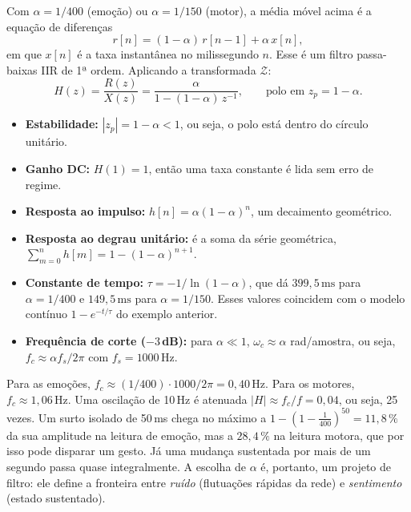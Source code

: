 \documentclass[11pt,a4paper]{article}
\newcommand{\ms}{\,\mathrm{ms}}
\newcommand{\Hz}{\,\mathrm{Hz}}
\begin{document}
Com $\alpha = 1/400$ (emoção) ou $\alpha=1/150$ (motor), a média móvel acima é a equação de diferenças
\begin{equation}
r[n] = (1-\alpha)\,r[n-1] + \alpha\,x[n],
\end{equation}
em que $x[n]$ é a taxa instantânea no milissegundo $n$. Esse é um filtro passa-baixas IIR de 1ª ordem. Aplicando a
transformada $\mathcal{Z}$:
\begin{equation}
H(z)=\frac{R(z)}{X(z)}=\frac{\alpha}{1-(1-\alpha)\,z^{-1}}, \qquad \text{polo em } z_p = 1-\alpha .
\end{equation}
\begin{itemize}
  \item \textbf{Estabilidade:} $|z_p| = 1-\alpha < 1$, ou seja, o polo está dentro do círculo unitário.
  \item \textbf{Ganho DC:} $H(1)=1$, então uma taxa constante é lida sem erro de regime.
  \item \textbf{Resposta ao impulso:} $h[n]=\alpha(1-\alpha)^n$, um decaimento geométrico.
  \item \textbf{Resposta ao degrau unitário:} é a soma da série geométrica,
        $\sum_{m=0}^{n}h[m] = 1-(1-\alpha)^{n+1}$.
  \item \textbf{Constante de tempo:} $\tau=-1/\ln(1-\alpha)$, que dá $399{,}5\ms$ para $\alpha = 1/400$ e $149{,}5\ms$ para
        $\alpha = 1/150$. Esses valores coincidem com o modelo contínuo $1-e^{-t/\tau}$ do exemplo anterior.
  \item \textbf{Frequência de corte ($-3$\,dB):} para $\alpha\ll1$, $\omega_c\approx\alpha$ rad/amostra, ou seja,
        $f_c\approx \alpha f_s/2\pi$ com $f_s = 1000\Hz$.
\end{itemize}

\begin{exemplo}
Para as emoções, $f_c \approx (1/400)\cdot1000/2\pi = 0{,}40\Hz$. Para os motores, $f_c \approx 1{,}06\Hz$. Uma oscilação de 10\,Hz é
atenuada $|H|\approx f_c/f = 0{,}04$, ou seja, 25 vezes. Um surto isolado de 50\,ms chega no máximo a
$1-(1-\tfrac{1}{400})^{50}=11{,}8\,\%$ da sua amplitude na leitura de emoção, mas a $28{,}4\,\%$ na leitura motora, que por isso
pode disparar um gesto. Já uma mudança sustentada por mais de um segundo passa quase integralmente. A escolha de $\alpha$ é, portanto, um projeto de filtro: ele define a fronteira entre
\emph{ruído} (flutuações rápidas da rede) e \emph{sentimento} (estado sustentado).
\end{exemplo}
\end{document}
